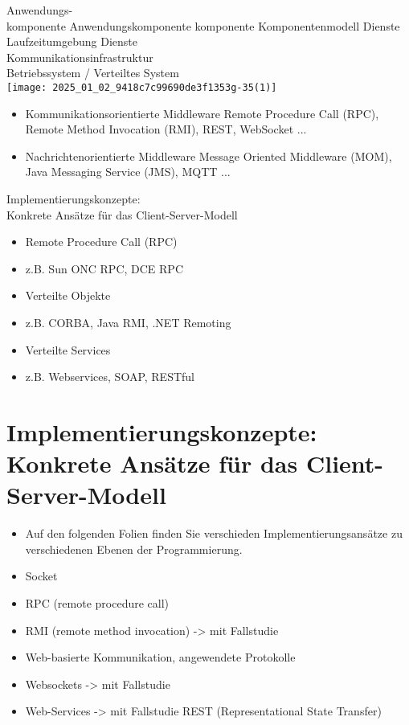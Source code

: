 \documentclass[10pt]{article}
\begin{document}
Anwendungs-\\
komponente Anwendungskomponente komponente Komponentenmodell Dienste Laufzeitumgebung Dienste\\
Kommunikationsinfrastruktur\\
Betriebssystem / Verteiltes System\\
\texttt{[image: 2025\_01\_02\_9418c7c99690de3f1353g-35(1)]}

\begin{itemize}
  \item Kommunikationsorientierte Middleware Remote Procedure Call (RPC), Remote Method Invocation (RMI), REST, WebSocket ...
  \item Nachrichtenorientierte Middleware Message Oriented Middleware (MOM), Java Messaging Service (JMS), MQTT ...
\end{itemize}

Implementierungskonzepte:\\
Konkrete Ansätze für das Client-Server-Modell

\begin{itemize}
  \item Remote Procedure Call (RPC)
  \item z.B. Sun ONC RPC, DCE RPC
  \item Verteilte Objekte
  \item z.B. CORBA, Java RMI, .NET Remoting
  \item Verteilte Services
  \item z.B. Webservices, SOAP, RESTful
\end{itemize}

\section*{Implementierungskonzepte: \\
 Konkrete Ansätze für das Client-Server-Modell}
\begin{itemize}
  \item Auf den folgenden Folien finden Sie verschieden Implementierungsansätze zu verschiedenen Ebenen der Programmierung.
  \item Socket
  \item RPC (remote procedure call)
  \item RMI (remote method invocation) -> mit Fallstudie
  \item Web-basierte Kommunikation, angewendete Protokolle
  \item Websockets -> mit Fallstudie
  \item Web-Services -> mit Fallstudie REST (Representational State Transfer)
\end{itemize}
\end{document}
